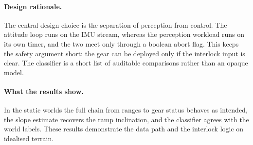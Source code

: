 \documentclass[11pt,a4paper]{article}
\begin{document}
\paragraph{Design rationale.} The central design choice is the separation of perception from control. The attitude loop runs on the IMU stream, whereas the perception workload runs on its own timer, and the two meet only through a boolean abort flag. This keeps the safety argument short: the gear can be deployed only if the interlock input is clear. The classifier is a short list of auditable comparisons rather than an opaque model.
 
\paragraph{What the results show.} In the static worlds the full chain from ranges to gear status behaves as intended, the slope estimate recovers the ramp inclination, and the classifier agrees with the world labels. These results demonstrate the data path and the interlock logic on idealised terrain.
 
\end{document}
